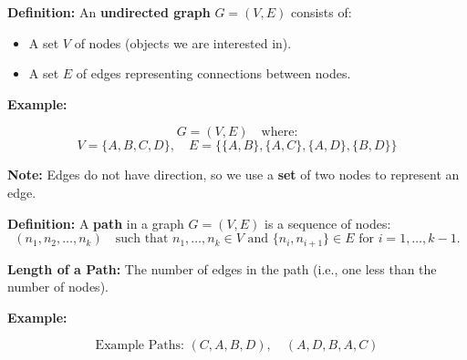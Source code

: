 \documentclass[a4paper,12pt]{article}
\begin{document}
\textbf{Definition:} An \textbf{undirected graph} \( G = (V, E) \) consists of:
\begin{itemize}
    \item A set \( V \) of nodes (objects we are interested in).
    \item A set \( E \) of edges representing connections between nodes.
\end{itemize}

\textbf{Example:}

\begin{center}
\end{center}

\[
G = (V, E) \quad \text{where:}
\]
\[
V = \{ A, B, C, D \}, \quad E = \{ \{A, B\}, \{A, C\}, \{A, D\}, \{B, D\} \}
\]

\textbf{Note:} Edges do not have direction, so we use a \textbf{set} of two nodes to represent an edge.

\textbf{Definition:} A \textbf{path} in a graph \( G = (V, E) \) is a sequence of nodes:
\[
(n_1, n_2, \ldots, n_k) \quad \text{such that } n_1, \ldots, n_k \in V \text{ and } \{n_i, n_{i+1}\} \in E \text{ for } i = 1, \ldots, k-1.
\]

\textbf{Length of a Path:} The number of edges in the path (i.e., one less than the number of nodes).

\textbf{Example:}

\begin{center}
\end{center}

\[
\text{Example Paths: } (C, A, B, D), \quad (A, D, B, A, C)
\]
\end{document}
